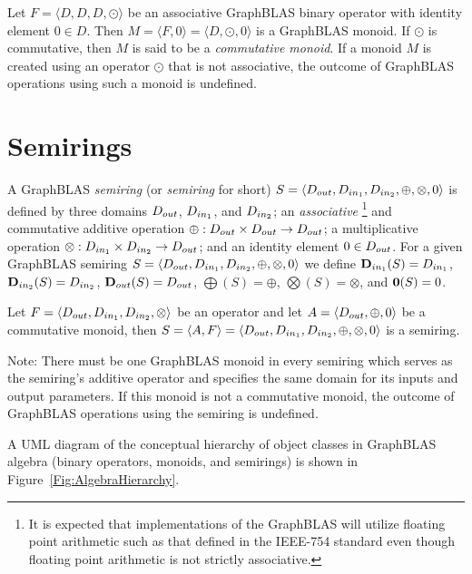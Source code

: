 Let $F = \langle D,D,D,\odot \rangle$ be an associative GraphBLAS binary operator
with identity element $0 \in D$.  Then $M = \langle F,0 \rangle = \langle
D,\odot,0 \rangle$ is a GraphBLAS monoid. If $\odot$ is commutative,
then $M$ is said to be a \emph{commutative monoid}.
If a monoid $M$ is created using an operator $\odot$ that is
not associative, the outcome of GraphBLAS operations using such a monoid is undefined.

\section{Semirings}

A GraphBLAS \emph{semiring} (or \emph{semiring} for short)
$S=\langle \mbox{$D_{out}$}, \mbox{$D_{in_{1}}$}, \mbox{$D_{in_{2}}$}, \oplus, \otimes, 0 \rangle$ is defined by
three domains $\mbox{$D_{out}$}$, $\mbox{$D_{in_{1}}$}$, and $\mbox{$D_{in_{2}}$}$; an \emph{associative}
\footnote{\label{Foot:associative}It is expected 
that implementations of the GraphBLAS will utilize floating point arithmetic 
such as that defined in the IEEE-754 standard even though
floating point arithmetic is not strictly associative.} 
and commutative
additive operation $\oplus : \mbox{$D_{out}$} \times \mbox{$D_{out}$} \rightarrow \mbox{$D_{out}$}$; 
a multiplicative operation $\otimes : \mbox{$D_{in_{1}}$} \times \mbox{$D_{in_{2}}$} \rightarrow
\mbox{$D_{out}$}$; and an identity element $0 \in \mbox{$D_{out}$}$.
For a given GraphBLAS semiring $S=\langle \mbox{$D_{out}$}, \mbox{$D_{in_{1}}$},
\mbox{$D_{in_{2}}$}, \oplus,\otimes,0 \rangle$ we define $\mbox{$\mathbf{D}_{in_{1}}$}(S) = \mbox{$D_{in_{1}}$}$,
$\mbox{$\mathbf{D}_{in_{2}}$}(S) = \mbox{$D_{in_{2}}$}$, $\mbox{$\mathbf{D}_{out}$}(S) = \mbox{$D_{out}$}$, $\mathbf{\bigoplus}(S) =
\oplus$, $\mathbf{\bigotimes}(S) = \otimes$, and ${\bf 0}(S) = 0$. 

Let $F = \langle \mbox{$D_{out}$},\mbox{$D_{in_{1}}$},\mbox{$D_{in_{2}}$},\otimes \rangle$ be an operator
and let $A = \langle \mbox{$D_{out}$},\oplus,0 \rangle$ be a commutative monoid,
then $S= \langle A,F \rangle = \langle \mbox{$D_{out}$},\mbox{$D_{in_{1}}$},\mbox{$D_{in_{2}}$},\oplus,\otimes,0 \rangle$
is a semiring.

Note: There must be one GraphBLAS monoid in every semiring which 
serves as the semiring's additive operator and  
specifies the same domain for its inputs and output parameters. 
If this monoid is not a commutative monoid, the outcome of GraphBLAS
operations using the semiring is undefined.

A UML diagram of the conceptual hierarchy of object classes in GraphBLAS
algebra (binary operators, monoids, and semirings) is shown in 
Figure~\ref{Fig:AlgebraHierarchy}.


